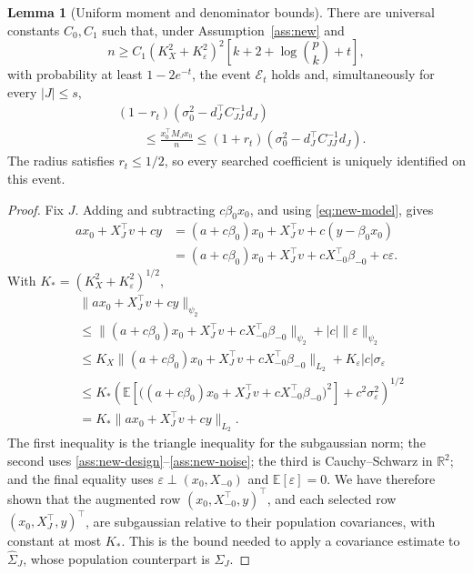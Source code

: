 \documentclass[a4paper,10pt,english]{article}
\theoremstyle{definition}
\newtheorem{lemma}{Lemma}
\begin{document}
\begin{review}
\begin{lemma}[Uniform moment and denominator bounds]\label{lem:new-uniform}
There are universal constants \(C_0,C_1\) such that, under
Assumption~\ref{ass:new} and
\begin{equation}\label{eq:new-sample-size}
 n\ge C_1(K_X^2+K_\varepsilon^2)^2
 \left[k+2+\log\binom pk+t\right],
\end{equation}
with probability at least \(1-2e^{-t}\), the event \(\mathcal E_t\)
holds and, simultaneously for every \(|J|\le s\),
\begin{equation}\label{eq:new-denominator}
 \begin{aligned}
 &(1-r_t)\left(\sigma_0^2-d_J^\top C_{JJ}^{-1}d_J\right)\\
 &\qquad\le\frac{x_0^\top M_Jx_0}{n}
 \le(1+r_t)\left(\sigma_0^2-d_J^\top C_{JJ}^{-1}d_J\right).
 \end{aligned}
\end{equation}
The radius satisfies \(r_t\le1/2\), so every searched coefficient
is uniquely identified on this event.
\end{lemma}

\begin{proof}
Fix \(J\).
\rbreak
Adding and subtracting \(c\beta_0x_0\), and using
\eqref{eq:new-model}, gives
\[
 \begin{aligned}
 a x_0+X_J^\top v+cy
 &=(a+c\beta_0)x_0+X_J^\top v+c(y-\beta_0x_0)\\
 &=(a+c\beta_0)x_0+X_J^\top v
 +cX_{-0}^\top\beta_{-0}+c\varepsilon.
 \end{aligned}
\]
\rbreak
With \(K_*=(K_X^2+K_\varepsilon^2)^{1/2}\),
\[
 \begin{aligned}
 &\|a x_0+X_J^\top v+cy\|_{\psi_2}\\
 &\le
 \|(a+c\beta_0)x_0+X_J^\top v
 +cX_{-0}^\top\beta_{-0}\|_{\psi_2}
 +|c|\|\varepsilon\|_{\psi_2}\\
 &\le
 K_X\|(a+c\beta_0)x_0+X_J^\top v
 +cX_{-0}^\top\beta_{-0}\|_{L_2}
 +K_\varepsilon|c|\sigma_\varepsilon\\
 &\le
 K_*\left(
 \mathbb E\left[
 \bigl((a+c\beta_0)x_0+X_J^\top v
 +cX_{-0}^\top\beta_{-0}\bigr)^2
 \right]+c^2\sigma_\varepsilon^2
 \right)^{1/2}\\
 &=K_*\|a x_0+X_J^\top v+cy\|_{L_2}.
 \end{aligned}
\]
The first inequality is the triangle inequality for the subgaussian norm;
the second uses \eqref{ass:new-design}--\eqref{ass:new-noise};
the third is Cauchy--Schwarz in \(\mathbb R^2\);
and the final equality uses
\(\varepsilon\perp(x_0,X_{-0})\) and
\(\mathbb E[\varepsilon]=0\).
\rbreak
We have therefore shown that the augmented row
\((x_0,X_{-0}^\top,y)^\top\), and each selected row
\((x_0,X_J^\top,y)^\top\), are subgaussian relative to their
population covariances, with constant at most \(K_*\).
\rbreak
This is the bound needed to apply a covariance estimate to
\(\widehat\Sigma_J\), whose population counterpart is \(\Sigma_J\).


\end{proof}
\end{review}
\end{document}
